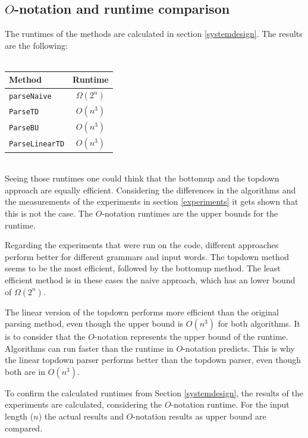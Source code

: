 \documentclass[a4paper, 11pt]{article}
\begin{document}



\subsection{$O$-notation and runtime comparison}
\label{runtime}


The runtimes of the methods are calculated in section \ref{systemdesign}. The results are the following:
\ \\ \\
\begin{tabular}{|l|c|}
\hline
Method & Runtime \\
\hline
\texttt{parseNaive} & $\Omega(2^n)$\\
\texttt{ParseTD} & $O(n^3)$ \\
\texttt{ParseBU} & $O(n^3)$\\
\texttt{ParseLinearTD} & $O(n^3)$\\
\hline
\end{tabular}

\ \\
Seeing those runtimes one could think that the bottomup and the topdown approach are equally efficient. Considering the differences in the algorithms and the measurements of the experiments in section \ref{experiments} it gets shown that this is not the case. The $O$-notation runtimes are the upper bounds for the runtime. 

Regarding the experiments that were run on the code, different approaches perform better for different grammars and input words. The topdown method seems to be the most efficient, followed by the bottomup method. The least efficient method is in these cases the naive approach, which has an lower bound of $\Omega(2^n)$.

The linear version of the topdown performs more efficient than the original parsing method, even though the upper bound is $O(n^3)$ for both algorithms. 
It is to consider that the $O$-notation represents the upper bound of the runtime. Algorithms can run faster than the runtime in $O$-notation predicts. This is why the linear topdown parser performs better than the topdown parser, even though both are in $O(n^3)$.

To confirm the calculated runtimes from Section \ref{systemdesign}, the results of the experiments are calculated, considering the $O$-notation runtime. For the input length ($n$) the actual results and $O$-notation results as upper bound are compared.
\end{document}
